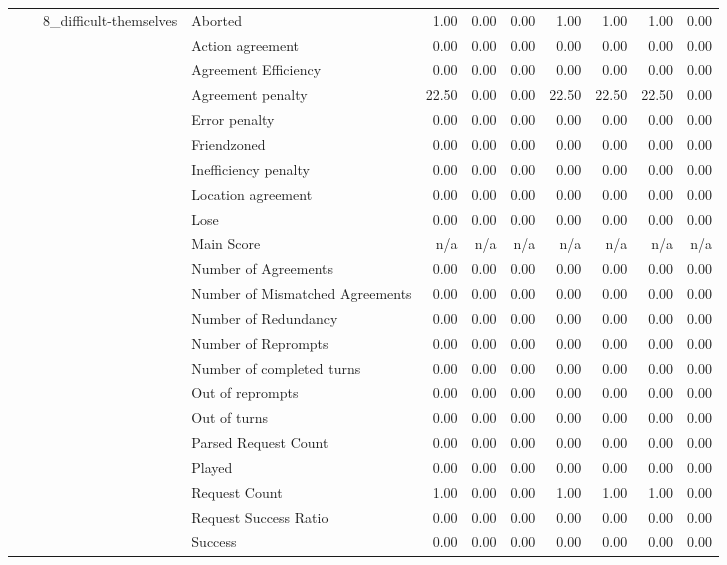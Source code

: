 \begin{tabular}{llllrrrrrrr}
\cline{3-11}
 &  & \multirow[t]{27}{*}{8_difficult-themselves} & Aborted & 1.00 & 0.00 & 0.00 & 1.00 & 1.00 & 1.00 & 0.00 \\
 &  &  & Action agreement & 0.00 & 0.00 & 0.00 & 0.00 & 0.00 & 0.00 & 0.00 \\
 &  &  & Agreement Efficiency & 0.00 & 0.00 & 0.00 & 0.00 & 0.00 & 0.00 & 0.00 \\
 &  &  & Agreement penalty & 22.50 & 0.00 & 0.00 & 22.50 & 22.50 & 22.50 & 0.00 \\
 &  &  & Error penalty & 0.00 & 0.00 & 0.00 & 0.00 & 0.00 & 0.00 & 0.00 \\
 &  &  & Friendzoned & 0.00 & 0.00 & 0.00 & 0.00 & 0.00 & 0.00 & 0.00 \\
 &  &  & Inefficiency penalty & 0.00 & 0.00 & 0.00 & 0.00 & 0.00 & 0.00 & 0.00 \\
 &  &  & Location agreement & 0.00 & 0.00 & 0.00 & 0.00 & 0.00 & 0.00 & 0.00 \\
 &  &  & Lose & 0.00 & 0.00 & 0.00 & 0.00 & 0.00 & 0.00 & 0.00 \\
 &  &  & Main Score & n/a & n/a & n/a & n/a & n/a & n/a & n/a \\
 &  &  & Number of Agreements & 0.00 & 0.00 & 0.00 & 0.00 & 0.00 & 0.00 & 0.00 \\
 &  &  & Number of Mismatched Agreements & 0.00 & 0.00 & 0.00 & 0.00 & 0.00 & 0.00 & 0.00 \\
 &  &  & Number of Redundancy & 0.00 & 0.00 & 0.00 & 0.00 & 0.00 & 0.00 & 0.00 \\
 &  &  & Number of Reprompts & 0.00 & 0.00 & 0.00 & 0.00 & 0.00 & 0.00 & 0.00 \\
 &  &  & Number of completed turns & 0.00 & 0.00 & 0.00 & 0.00 & 0.00 & 0.00 & 0.00 \\
 &  &  & Out of reprompts & 0.00 & 0.00 & 0.00 & 0.00 & 0.00 & 0.00 & 0.00 \\
 &  &  & Out of turns & 0.00 & 0.00 & 0.00 & 0.00 & 0.00 & 0.00 & 0.00 \\
 &  &  & Parsed Request Count & 0.00 & 0.00 & 0.00 & 0.00 & 0.00 & 0.00 & 0.00 \\
 &  &  & Played & 0.00 & 0.00 & 0.00 & 0.00 & 0.00 & 0.00 & 0.00 \\
 &  &  & Request Count & 1.00 & 0.00 & 0.00 & 1.00 & 1.00 & 1.00 & 0.00 \\
 &  &  & Request Success Ratio & 0.00 & 0.00 & 0.00 & 0.00 & 0.00 & 0.00 & 0.00 \\
 &  &  & Success & 0.00 & 0.00 & 0.00 & 0.00 & 0.00 & 0.00 & 0.00 \\

\end{tabular}
